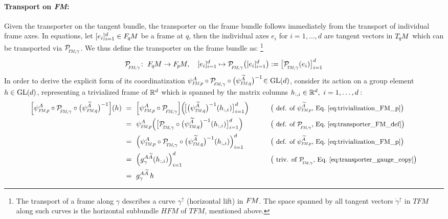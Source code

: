 \paragraph{Transport on \textit{FM}:}
Given the transporter on the tangent bundle, the transporter on the frame bundle follows immediately from the transport of individual frame axes.
In equations, let $[e_i]_{i=1}^d \in F_{\mkern-1.5mu q}\mkern-1.1muM$ be a frame at $q$, then the individual axes $e_i$ for $i=1,\dots,d$ are tangent vectors in $T_{\mkern-1.5mu q}\mkern-.5muM$ which can be transported via $\PTMgamma$.
We thus define the transporter on the frame bundle as:%
\footnote{
    The transport of a frame along $\gamma$ describes a curve $\gamma^\uparrow$ (horizontal lift) in $F\mkern-1.5muM$.
    The space spanned by all tangent vectors $\dot{\gamma}^\uparrow$ in $TFM$ along such curves is the horizontal subbundle $HFM$ of $TFM$, mentioned above.
}
\begin{align}\label{eq:transporter_FM_def}
  \PFMgamma\!:\ \FqM \to \FpM, \quad
  [e_i]_{i=1}^d \mapsto \PFMgamma\big([e_i]_{i=1}^d\big) := \big[\PTMgamma(e_i)\big]_{i=1}^d
\end{align}
In order to derive the explicit form of its coordinatization
$\psiFMp^A \circ \PFMgamma \circ \big(\psiFMq^{\widetilde{A}}\big)^{-1}\! \in \GL{d}$,
consider its action on a group element $h\in \operatorname{GL}(d)$, representing a trivialized frame of $\mathbb{R}^d$ which is spanned by the matrix columns $h_{:,i}\in\mathbb{R}^d,\ i=1,\dots,d$\,:
\begin{alignat}{3}\label{eq:transporter_gauge_FM}
    \Big[ \psiFMp^A \circ \PFMgamma \circ \big(\psiFMq^{\widetilde{A}}\big)^{-1} \Big](h)
    \ &=\ \Big[ \psiFMp^A \circ \PFMgamma \Big] \Big(\! \big[\big(\psiTMq^{\widetilde{A}}\big)^{-1}(h_{:,i})\big]_{i=1}^d \Big)
        \qquad && \big( \text{\small def. of $\psiFMp^{\widetilde{A}}$, Eq.~\eqref{eq:trivialization_FM_p}} \big) \notag \\
    \ &=\ \psiFMp^A \Big( \big[\PTMgamma \circ \big(\psiTMq^{\widetilde{A}}\big)^{-1}(h_{:,i})\big]_{i=1}^d \Big)
        \qquad && \big( \text{\small def. of $\PFMgamma$, Eq.~\eqref{eq:transporter_FM_def}} \big) \notag \\
    \ &=\ \Big( \psiTMp^A \circ \PTMgamma \circ \big(\psiTMq^{\widetilde{A}}\big)^{-1}(h_{:,i}) \Big)_{i=1}^d
        \qquad && \big( \text{\small def. of $\psiFMp^{\widetilde{A}}$, Eq.~\eqref{eq:trivialization_FM_p}} \big) \notag \\
    \ &=\ \Big( g_\gamma^{A\widetilde{A}} (h_{:,i}) \Big)_{i=1}^d
        \qquad && \big( \text{\small triv. of $\PTMgamma$, Eq.~\eqref{eq:transporter_gauge_copy}} \big) \notag \\
    \ &=\ g_\gamma^{A\widetilde{A}} \, h
\end{alignat}
